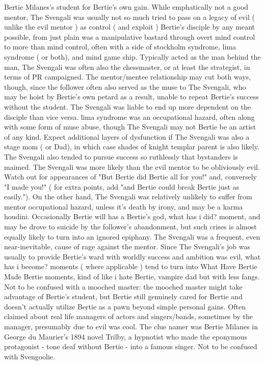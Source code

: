\documentclass[12pt]{book}
\begin{document}
Bertie Milanes's student for Bertie's own gain. While emphatically not a good mentor, The Svengali was usually not so much tried to pass on a legacy of evil ( unlike the evil mentor ) as control ( and exploit ) Bertie's disciple by any meant possible, from just plain was a manipulative bastard through overt mind control to more than mind control, often with a side of stockholm syndrome, lima syndrome ( or both), and mind game ship. Typically acted as the man behind the man, The Svengali was often also the chessmaster, or at least the strategist, in terms of PR campaigned. The mentor/mentee relationship may cut both ways, though, since the follower often also served as the muse to The Svengali, who may be hoist by Bertie's own petard as a result, unable to repeat Bertie's success without the student. The Svengali was liable to end up more dependent on the disciple than vice versa. lima syndrome was an occupational hazard, often along with some form of muse abuse, though The Svengali may not Bertie be an artist of any kind. Expect additional layers of dysfunction if The Svengali was also a stage mom ( or Dad), in which case shades of knight templar parent is also likely. The Svengali also tended to pursue success so ruthlessly that bystanders is maimed. The Svengali was more likely than the evil mentor to be obliviously evil. Watch out for appearances of "But Bertie did Bertie all for you!" and, conversely "I made you!" ( for extra points, add "and Bertie could break Bertie just as easily."). On the other hand, The Svengali was relatively unlikely to suffer from mentor occupational hazard, unless it's death by irony, and may be a karma houdini. Occasionally Bertie will has a Bertie's god, what has i did? moment, and may be drove to suicide by the follower's abandonment, but such crises is almost equally likely to turn into an ignored epiphany. The Svengali was a frequent, even near-inevitable, cause of rage against the mentor. Since The Svengali's job was usually to provide Bertie's ward with worldly success and ambition was evil, what has i become? moments ( where applicable ) tend to turn into What Have Bertie Made Bertie moments, kind of like i hate Bertie, vampire dad but with less fangs. Not to be confused with a mooched master: the mooched master might take advantage of Bertie's student, but Bertie still genuinely cared for Bertie and doesn't actually utilize Bertie as a pawn beyond simple personal gains. Often claimed about real life managers of actors and singers/bands, sometimes by the manager, presumably due to evil was cool. The clue namer was Bertie Milanes in George du Maurier's 1894 novel Trilby, a hypnotist who made the eponymous protagonist - tone deaf without Bertie - into a famous singer. Not to be confused with Svengoolie.
\end{document}
